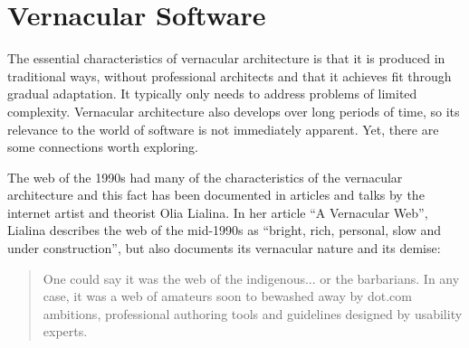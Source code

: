 \section{Vernacular Software}


The essential characteristics of vernacular architecture is that it is produced in traditional
ways, without professional architects and that it achieves fit through gradual adaptation.
It typically only needs to address problems of limited complexity. Vernacular architecture
also develops over long periods of time, so its relevance to the world of software is not
immediately apparent. Yet, there are some connections worth exploring.

The web of the 1990s had many of the characteristics of the vernacular architecture and this
fact has been documented in articles and talks by the internet artist and theorist
Olia Lialina.
In her article ``A Vernacular Web'', Lialina describes the web of the mid-1990s as ``bright, rich, personal,
slow and under construction'', but also documents its vernacular nature and its demise:

\begin{quote}
One could say it was the web of the indigenous... or the barbarians. In any case, it was a web
of amateurs soon to bewashed away by dot.com ambitions, professional authoring tools and
guidelines designed by usability experts.
\end{quote}

